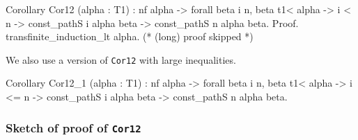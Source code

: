 
\begin{Coqsrc}
Corollary Cor12 (alpha : T1) :  nf alpha ->
         forall beta i n, beta  t1< alpha  ->
                i < n ->
                 const_pathS i alpha beta ->
                 const_pathS n alpha beta.
Proof.
  transfinite_induction_lt alpha.
  (* (long) proof skipped *)
\end{Coqsrc}

We  also use a version of \texttt{Cor12} with large inequalities.


\begin{Coqsrc}
Corollary Cor12_1 (alpha : T1) :
  nf alpha ->
  forall beta i n, beta t1< alpha ->
                   i <= n ->
                   const_pathS i alpha beta ->
                   const_pathS n alpha beta.
\end{Coqsrc}


\subsubsection{Sketch of proof of \texttt{Cor12}}

